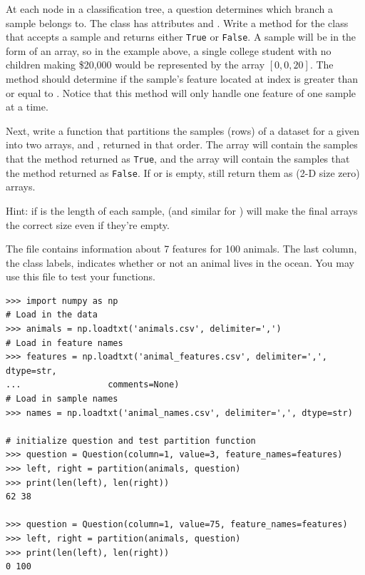 \begin{problem} %
At each node in a classification tree, a question determines which branch a sample belongs to.
The  class has attributes  and .
Write a  method for the  class that accepts a sample and returns either \texttt{True} or \texttt{False}.
A sample will be in the form of an array, so in the example above, a single college student with no children making \$20,000 would be represented by the array $[0,0,20]$.
The method should determine if the sample's feature located at index  is greater than or equal to .
Notice that this method will only handle one feature of one sample at a time.

Next, write a  function that partitions the samples (rows) of a dataset for a given  into two  arrays,  and , returned in that order.
The array  will contain the samples that the  method returned as \texttt{True}, and the array  will contain the samples that the  method returned as \texttt{False}.
If  or  is empty, still return them as (2-D size zero) arrays.

Hint: if  is the length of each sample,  (and similar for ) will make the final arrays the correct size even if they're empty.

The file  contains information about 7 features for 100 animals.
The last column, the class labels, indicates whether or not an animal lives in the ocean.
You may use this file to test your functions.

\begin{lstlisting}
>>> import numpy as np
# Load in the data
>>> animals = np.loadtxt('animals.csv', delimiter=',')
# Load in feature names
>>> features = np.loadtxt('animal_features.csv', delimiter=',', dtype=str, 
...					comments=None)
# Load in sample names
>>> names = np.loadtxt('animal_names.csv', delimiter=',', dtype=str)

# initialize question and test partition function
>>> question = Question(column=1, value=3, feature_names=features)
>>> left, right = partition(animals, question)
>>> print(len(left), len(right))
62 38

>>> question = Question(column=1, value=75, feature_names=features)
>>> left, right = partition(animals, question)
>>> print(len(left), len(right))
0 100
\end{lstlisting}

\label{prob:1}
\end{problem}


